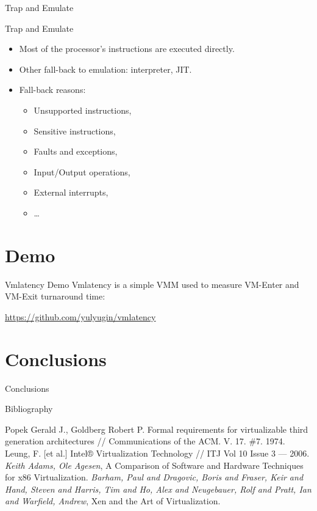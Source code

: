 \begin{frame}{Trap and Emulate}
\centering
{}
\end{frame}

\begin{frame}{Trap and Emulate}
\begin{itemize}
\item Most of the processor's instructions are executed directly.
\item Other fall-back to emulation: interpreter, JIT.\pause
\item Fall-back reasons:
  \begin{itemize}
  \item Unsupported instructions,
  \item Sensitive instructions,
  \item Faults and exceptions,
  \item Input/Output operations,
  \item External interrupts,
  \item \dots
  \end{itemize}
\end{itemize}
\end{frame}

\section{Demo}

\begin{frame}{Vmlatency Demo}
Vmlatency is a simple VMM used to measure VM-Enter and VM-Exit turnaround time:

\url{https://github.com/yulyugin/vmlatency}
\end{frame}

\section*{Conclusions}

\begin{frame}{Conclusions}
\tableofcontents
\end{frame}

\begin{frame}[allowframebreaks]{Bibliography}
\begin{thebibliography}{99}
 Popek Gerald J., Goldberg Robert P. Formal requirements for
  virtualizable third generation architectures // Communications of the ACM.
  V. 17. \#7. 1974.
 Leung, F. [et al.] Intel® Virtualization Technology // ITJ Vol
  10 Issue 3 — 2006.
\bibitem{} \textit{Keith Adams, Ole Agesen}, A Comparison of Software and
  Hardware Techniques for x86 Virtualization.
\bibitem{} \textit{Barham, Paul and Dragovic, Boris and Fraser, Keir and Hand,
  Steven and Harris, Tim and Ho, Alex and Neugebauer, Rolf and Pratt, Ian and
  Warfield, Andrew}, Xen and the Art of Virtualization.
\end{thebibliography}
\end{frame}

